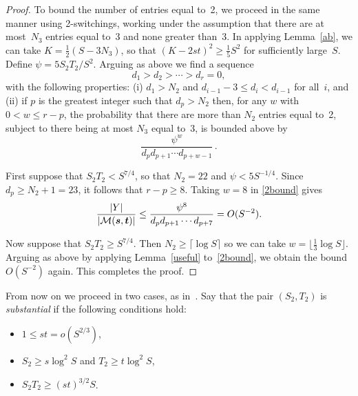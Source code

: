 \documentclass[12pt]{article}
\numberwithin{equation}{section}
\def\M{{\mathcal{M}}}
\def\svec{{\boldsymbol{s}}}
\def\tvec{{\boldsymbol{t}}}
\def\Mst{{\M(\svec,\tvec)}}
\begin{document}
\begin{proof}
\medskip
To bound the number of entries equal to~2, we proceed in
the same manner using 2-switchings, working under the
assumption that there are at most~$N_3$ entries equal to~3
and none greater than~3.
In applying Lemma~\ref{ab},
we can take $K=\tfrac12(S-3N_3)$, so that
$(K-2st)^2 \ge \tfrac15 S^2$ for sufficiently large~$S$.
Define $\psi=5S_2T_2/S^2$.
Arguing as above we find a sequence 
\[ d_1 > d_2 > \cdots > d_r = 0,\]
with the following properties: (i) $d_1 > N_2$ and 
$d_{i-1} -3\le  d_{i} < d_{i-1}$ 
for all~$i$, and
(ii)
if $p$ is the greatest integer such that $d_p>N_2$ then,
for any $w$ with $0<w\le r-p$,
the probability that there are
more than $N_2$ entries equal to~2, subject to there being at
most $N_3$ equal to~3, is bounded above by
\begin{equation}\label{2bound}
  \frac{\psi^w}{d_p d_{p+1}\cdots d_{p+w-1}}\,.
\end{equation}

First suppose that $S_2T_2 < S^{7/4}$, so that $N_2=22$ and
$\psi < 5S^{-1/4}$.
Since $d_p\geq N_2+1 = 23$, it follows that $r-p\geq 8$.
Taking $w=8$ in \eqref{2bound} gives 
\[ 
 \frac{\card{Y}}{\card{\Mst}}
    \leq \frac{\psi^8}{d_p d_{p+1}\cdots d_{p+7}}
   = O(S^{-2}).
\]

Now suppose that $S_2T_2\geq S^{7/4}$.
Then $N_2\geq \lceil\log S\rceil$
so we can take $w = \lfloor \tfrac13\log S\rfloor$.
Arguing as above by applying Lemma~\ref{useful} to~\eqref{2bound}, 
we obtain the bound $O(S^{-2})$ again.
This completes the proof.
\end{proof}

\medskip

{}From now on we proceed in two cases, as in~\cite{GMW}.
Say that the pair $(S_2,T_2)$ is \emph{substantial} if the
following conditions hold:
\begin{itemize}\itemsep=0pt
 \item $1\le st = o(S^{2/3})$,
 \item $S_2 \ge s\log^2 S$ and $T_2 \ge t\log^2 S$,
 \item $S_2T_2 \ge (st)^{3/2} S$.
\end{itemize}
\end{document}
